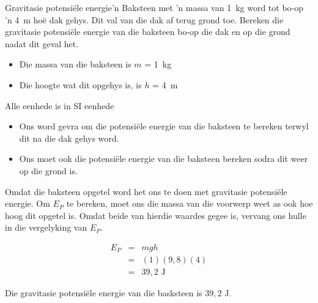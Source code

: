 \begin{wex}{Gravitasie potensi\"{e}le energie}{'n Baksteen met  'n massa van 1~kg word tot bo-op  'n 4~m ho\"{e} dak gehys. Dit val van die dak af terug grond toe. Bereken die gravitasie potensi\"{e}le energie van die baksteen bo-op die dak en op die grond nadat dit geval het.}{


\begin{minipage}{\textwidth}
\begin{itemize}
\item{Die massa van die baksteen is $m$ = 1~kg}
\item{Die hoogte wat dit opgehys is, is $h$ = 4~m}
\end{itemize}
Alle eenhede is in SI eenhede
\end{minipage}



\begin{minipage}{0.75\textwidth}
\begin{itemize}
\item Ons word gevra om die potensi\"{e}le energie van die baksteen te bereken terwyl dit na die dak gehys word.
\item Ons moet ook die potensi\"{e}le energie van die baksteen bereken sodra dit weer op die grond is.
\end{itemize}
\end{minipage}
Omdat die baksteen opgetel word het ons te doen met gravitasie potensiële energie. Om $E_{P}$ te bereken, moet ons die massa van die voorwerp weet as ook hoe hoog dit opgetel is. 
Omdat beide van hierdie waardes gegee is, vervang ons hulle in die vergelyking van $E_{P}$.


\begin{eqnarray*}
E_{P} & = & mgh \\
&=& (1)(9,8)(4) \\
&=& 39,2 \text{ J}
\end{eqnarray*}

Die gravitasie potensiële energie van die basksteen is $39,2$ J.
}
\end{wex}


